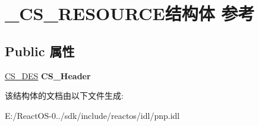 \hypertarget{struct___c_s___r_e_s_o_u_r_c_e}{}\section{\+\_\+\+C\+S\+\_\+\+R\+E\+S\+O\+U\+R\+C\+E结构体 参考}
\label{struct___c_s___r_e_s_o_u_r_c_e}
\subsection*{Public 属性}
\begin{DoxyCompactItemize}
\item 
\mbox{\label{struct___c_s___r_e_s_o_u_r_c_e_a443430f276c484b40ef43a60a24aa36b}} 
\hyperlink{struct_c_s___des__s}{C\+S\+\_\+\+D\+ES} {\bfseries C\+S\+\_\+\+Header}
\end{DoxyCompactItemize}


该结构体的文档由以下文件生成\+:\begin{DoxyCompactItemize}
\item 
E\+:/\+React\+O\+S-\/0../sdk/include/reactos/idl/pnp.\+idl\end{DoxyCompactItemize}
